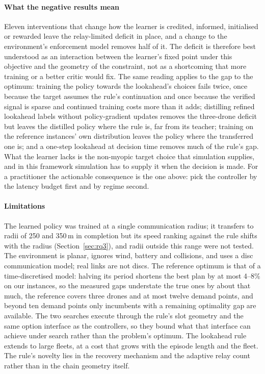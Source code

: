 \documentclass[final,5p,times,twocolumn]{elsarticle}
\begin{document}
\paragraph{What the negative results mean}
Eleven interventions that change how the learner is credited, informed, initialised or rewarded leave
the relay-limited deficit in place, and a change to the environment's enforcement model removes
half of it. The deficit is therefore best understood as an interaction between the learner's
fixed point under this objective and the geometry of the constraint, not as a shortcoming that
more training or a better critic would fix. The same reading applies to the gap to the optimum:
training the policy towards the lookahead's choices fails twice, once because the target assumes
the rule's continuation and once because the verified signal is sparse and continued training
costs more than it adds; distilling refined lookahead labels without policy-gradient updates
removes the three-drone deficit but leaves the distilled policy where the rule is, far from its
teacher; training on the reference instances' own distribution leaves the policy where the transferred one is; and a one-step lookahead at decision time
removes much of the rule's gap. What the learner lacks is the non-myopic target choice that simulation supplies, and
in this framework simulation has to supply it when the decision is made. For a practitioner the
actionable consequence is the one above: pick the controller by the latency budget first and by
regime second.

\paragraph{Limitations}
The learned policy was trained at a single communication radius; it transfers to radii of 250 and
350\,m in completion but its speed ranking against the rule shifts with the radius
(Section~\ref{sec:rq3}), and radii outside this range were not tested. The environment is planar, ignores
wind, battery and collisions, and uses a disc communication model; real links are not discs. The
reference optimum is that of a time-discretised model: halving its period shortens the best plan
by at most 4--8\% on our instances, so the measured gaps understate the true ones by about that
much, the reference covers three drones and at most twelve demand points, and beyond ten demand
points only incumbents with a remaining optimality gap are available. The two searches execute
through the rule's slot geometry and the same option interface as the controllers, so they bound
what that interface can achieve under search rather than the problem's optimum. The lookahead rule extends to large fleets, at a cost that grows with the episode
length and the fleet. The
rule's novelty lies in the recovery mechanism and the adaptive relay count rather than in the
chain geometry itself.
\end{document}
